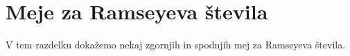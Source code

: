\documentclass[twoside,11pt]{article}
\begin{document}
%
%
%
%
%

\section{Meje za Ramseyeva števila}

V tem razdelku dokažemo nekaj zgornjih in spodnjih mej za Ramseyeva števila.
\end{document}
